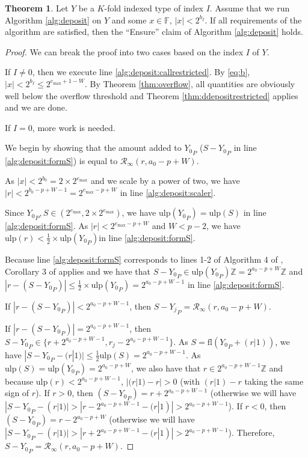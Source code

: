 \documentclass[12pt]{article}
\providecommand{\F}{\ensuremath{\mathbb{F}}}
\providecommand{\Z}{\ensuremath{\mathbb{Z}}}
\providecommand{\max}{\ensuremath{\text{max}}}
\providecommand{\ulp}{\ensuremath{\text{ulp}}}
\providecommand{\fl}{\ensuremath{\text{fl}}}
\providecommand{\roundtonearestinfty}{\ensuremath{\mathcal{R}_\text{$\infty$}}}
\theoremstyle{definition}
\newtheorem{thm}{Theorem}[section]
\numberwithin{equation}{section}
\numberwithin{figure}{section}
\begin{document}
      \begin{samepage}
      \begin{thm}
        Let $Y$ be a $K$-fold indexed type of index $I$. Assume that we run Algorithm \ref{alg:deposit} on $Y$ and some $x \in \F$, $|x| < 2^{b_I}$. If all requirements of the algorithm are satisfied, then the ``Ensure'' claim of Algorithm \ref{alg:deposit} holds.
        \label{thm:ddeposit}
      \end{thm}
    \end{samepage}

      \begin{proof}
        We can break the proof into two cases based on the index $I$ of $Y$.

        If $I \neq 0$, then we execute line \ref{alg:deposit:callrestricted}. By  \eqref{eq:b}, $|x| < 2^{b_I} \leq 2^{e_{\max} + 1 - W}$. By Theorem \ref{thm:overflow}, all quantities are obviously well below the overflow threshold and Theorem \ref{thm:ddepositrestricted} applies and we are done.

        If $I = 0$, more work is needed.

        We begin by showing that the amount added to ${Y_0}_P$ ($S - {Y_0}_P$ in line \ref{alg:deposit:formS}) is equal to $\roundtonearestinfty(r, a_0 - p + W)$.

        As $|x| < 2^{b_0} = 2 \times 2^{e_{\max}}$ and we scale by a power of two, we have $|r| < 2^{b_0 - p + W - 1} = 2^{e_{\max} - p + W}$ in line \ref{alg:deposit:scaler}.

        Since ${Y_0}_P, S \in (2^{e_{\max}}, 2 \times 2^{e_{\max}})$, we have $\ulp({Y_0}_P) = \ulp(S)$ in line \ref{alg:deposit:formS}. As $|r| < 2^{e_{\max} - p + W}$ and $W < p - 2$, we have $\ulp(r) < \frac{1}{2}\times \ulp({Y_0}_P)$in line \ref{alg:deposit:formS}.

        Because line \ref{alg:deposit:formS} corresponds to lines 1-2 of Algorithm 4 of \cite{repsum}, Corollary 3 of \cite{repsum} applies and we have that $S - {Y_0}_P \in \ulp({Y_0}_P)\Z = 2^{a_0 - p + W}\Z$ and $|r - (S - {Y_0}_P)| \leq \frac{1}{2} \times \ulp({Y_0}_P) = 2^{a_0 - p + W - 1}$ in line \ref{alg:deposit:formS}.

        If $|r - (S - {Y_0}_P)| < 2^{a_{0} - p + W - 1}$, then $S - {Y_j}_P = \roundtonearestinfty(r, a_{0} - p + W)$.

        If $|r - (S - {Y_0}_P)| = 2^{a_{0} - p + W - 1}$, then $S - {Y_0}_P \in \{r + 2^{a_0 - p + W - 1},  r_j - 2^{a_{0} - p + W - 1}\}$.
        As $S = \fl({Y_0}_P + (r|1))$, we have $|S - {Y_0}_P - (r|1)| \leq \frac{1}{2}\ulp(S) = 2^{a_{0} - p + W - 1}$.  As $\ulp(S) = \ulp({Y_0}_P) = 2^{a_{0} - p + W}$, we also have that $r \in 2^{a_{0} - p + W - 1}\Z$  and because $\ulp(r) < 2^{a_{0} - p + W - 1}$, $|(r|1) - r| > 0$ (with $(r|1) - r$ taking the same sign of $r$).
        If $r > 0$, then $(S - {Y_0}_P) = r + 2^{a_{0} - p + W - 1}$ (otherwise we will have $|S - {Y_0}_P - (r|1)| > |r - 2^{a_{0} - p + W - 1} - (r|1)| > 2^{a_{0} - p + W - 1}$).
        If $r < 0$, then $(S - {Y_0}_P) = r - 2^{a_{0} - p + W}$ (otherwise we will have $|S - {Y_0}_P - (r|1)| > |r + 2^{a_{0} - p + W - 1} - (r|1)| > 2^{a_{0} - p + W - 1}$). Therefore, $S - {Y_0}_P = \roundtonearestinfty(r, a_{0} - p + W)$.


\end{proof}
\end{document}

